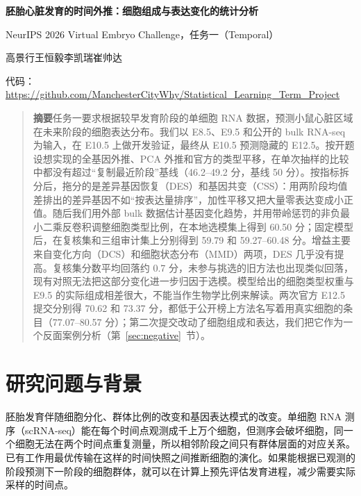 \documentclass[UTF8,zihao=-4,fontset=none,a4paper]{ctexart}
\begin{document}
\begin{center}
{\bfseries 胚胎心脏发育的时间外推：细胞组成与表达变化的统计分析\par}
\vspace{4pt}
{\normalsize NeurIPS 2026 Virtual Embryo Challenge，任务一（Temporal）\par}
\vspace{4pt}
{\small 高景行\quad 王恒毅\quad 李凯瑞\quad 崔帅达\par}
\vspace{2pt}
{\small 代码：\url{https://github.com/ManchesterCityWhy/Statistical_Learning_Term_Project}\par}
\end{center}

\begin{quote}\small
\textbf{摘要}\quad 任务一要求根据较早发育阶段的单细胞 RNA 数据，预测小鼠心脏区域在未来阶段的细胞表达分布。我们以 E8.5、E9.5 和公开的 bulk RNA-seq 为输入，在 E10.5 上做开发验证，最终从 E10.5 预测隐藏的 E12.5。按开题设想实现的全基因外推、PCA 外推和官方的类型平移，在单次抽样的比较中都没有超过“复制最近阶段”基线（46.2--49.2 分，基线 50 分）。按指标拆分后，拖分的是差异基因恢复（DES）和基因共变（CSS）：用两阶段均值差排出的差异基因不如“按表达量排序”，加性平移又把大量零表达变成小正值。随后我们用外部 bulk 数据估计基因变化趋势，并用带岭惩罚的非负最小二乘反卷积调整细胞类型比例，在本地选模集上得到 60.50 分；固定模型后，在复核集和三组审计集上分别得到 59.79 和 59.27--60.48 分。增益主要来自变化方向（DCS）和细胞状态分布（MMD）两项，DES 几乎没有提高。复核集分数平均回落约 0.7 分，未参与挑选的旧方法也出现类似回落，现有对照无法把这部分变化进一步归因于选模。模型给出的细胞类型权重与 E9.5 的实际组成相差很大，不能当作生物学比例来解读。两次官方 E12.5 提交分别得 70.62 和 73.37 分，都低于公开榜上方法名写着用真实细胞的条目（77.07--80.57 分）；第二次提交改动了细胞组成和表达，我们把它作为一个反面案例分析（第~\ref{sec:negative}~节）。
\end{quote}

\section{研究问题与背景}

胚胎发育伴随细胞分化、群体比例的改变和基因表达模式的改变。单细胞 RNA 测序（scRNA-seq）能在每个时间点观测成千上万个细胞，但测序会破坏细胞，同一个细胞无法在两个时间点重复测量，所以相邻阶段之间只有群体层面的对应关系。已有工作用最优传输在这样的时间快照之间推断细胞的演化\cite{schiebinger}。如果能根据已观测的阶段预测下一阶段的细胞群体，就可以在计算上预先评估发育进程，减少需要实际采样的时间点。
\end{document}
